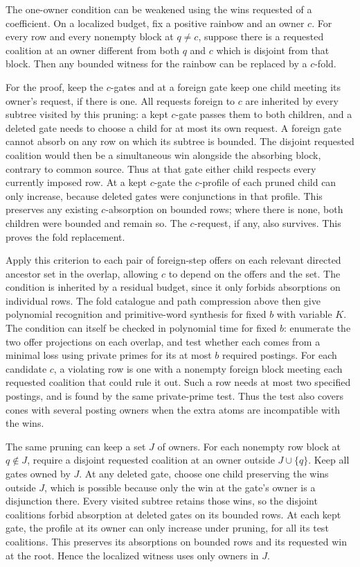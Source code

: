 The one-owner condition can be weakened using the wins
requested of a coefficient. On a localized budget, fix
a positive rainbow and an owner $c$. For every row and
every nonempty block at $q\ne c$, suppose there is a
requested coalition at an owner different from both
$q$ and $c$ which is disjoint from that block. Then any
bounded witness for the rainbow can be replaced by a
$c$-fold.

For the proof, keep the $c$-gates and at a foreign gate
keep one child meeting its owner's request, if there is
one. All requests foreign to $c$ are inherited by every
subtree visited by this pruning: a kept $c$-gate passes
them to both children, and a deleted gate needs to
choose a child for at most its own request. A foreign
gate cannot absorb on any row on which its subtree is
bounded. The disjoint requested coalition would then
be a simultaneous win alongside the absorbing block,
contrary to common source. Thus at that gate either
child respects every currently imposed row. At a kept
$c$-gate the $c$-profile of each pruned child can only
increase, because deleted gates were conjunctions in
that profile. This preserves any existing $c$-absorption
on bounded rows; where there is none, both children
were bounded and remain so. The $c$-request, if any,
also survives. This proves the fold replacement.

Apply this criterion to each pair of foreign-step
offers on each relevant directed ancestor set in the
overlap, allowing $c$ to depend on the offers and the
set. The condition is inherited by a residual budget,
since it only forbids absorptions on individual rows.
The fold catalogue and path compression above then
give polynomial recognition and primitive-word
synthesis for fixed $b$ with variable $K$. The
condition can itself be checked in polynomial time
for fixed $b$: enumerate the two offer projections
on each overlap, and test whether each comes from
a minimal loss using private primes for its at most
$b$ required postings. For each candidate $c$, a
violating row is one with a nonempty foreign block
meeting each requested coalition that could rule it
out. Such a row needs at most two specified postings,
and is found by the same private-prime test. Thus the
test also covers cones with several posting owners
when the extra atoms are incompatible with the wins.

The same pruning can keep a set $J$ of owners. For
each nonempty row block at $q\notin J$, require a
disjoint requested coalition at an owner outside
$J\cup\{q\}$. Keep all gates owned by $J$. At any
deleted gate, choose one child preserving the wins
outside $J$, which is possible because only the win
at the gate's owner is a disjunction there. Every
visited subtree retains those wins, so the disjoint
coalitions forbid absorption at deleted gates on its
bounded rows. At each kept gate, the profile at its
owner can only increase under pruning, for all its
test coalitions. This preserves its absorptions on
bounded rows and its requested win at the root.
Hence the localized witness uses only owners in $J$.

